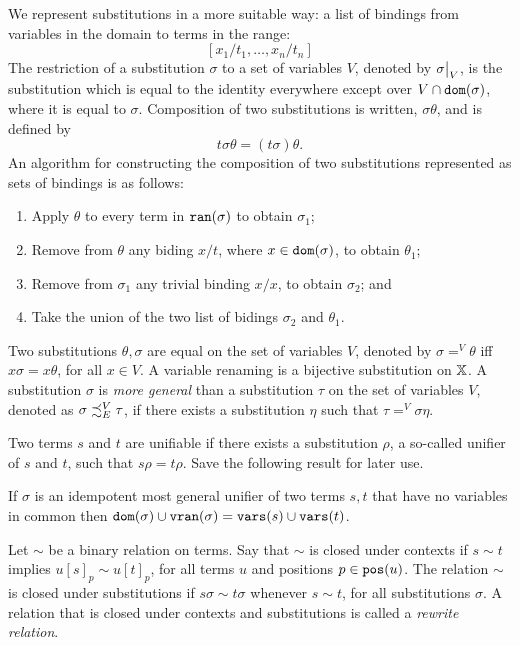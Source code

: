 We represent substitutions in a more suitable way: a list of bindings from variables in the domain to terms in the range:
$$[x_1 / t_1, \dots, x_n / t_n ]$$
The restriction of a substitution $\sigma$ to a set of variables $V$, denoted by $\restr{\sigma}{V}$, is the substitution which is equal to the identity everywhere except over $V \cap \mathtt{dom}(\sigma)$, where it is equal to $\sigma$. Composition of two substitutions is written, $\sigma \theta$, and is defined by
$$t\sigma \theta = (t\sigma)\theta.$$
An algorithm for constructing the composition of two substitutions represented as sets of bindings is as follows:
\begin{enumerate}
    \item Apply $\theta$ to every term in $\mathtt{ran}(\sigma)$ to obtain $\sigma_1$;
    \item Remove from $\theta$ any biding $x/t$, where $x \in \mathtt{dom}(\sigma)$, to obtain $\theta_1$;
    \item Remove from $\sigma_1$ any trivial binding $x/x$, to obtain $\sigma_2$; and
    \item Take the union of the two list of bidings $\sigma_2$ and $\theta_1$.
\end{enumerate}
Two substitutions $\theta, \sigma$ are equal on the set of variables $V$, denoted by $\sigma =^V \theta$ iff $x \sigma = x \theta$, for all $x \in V$. A variable renaming is a bijective substitution on $\mathbb{X}$. A substitution $\sigma$ is \textit{more general} than a substitution $\tau$ on the set of variables $V$, denoted as $\sigma \iqoless[E][V] \tau$, if there exists a substitution $\eta$ such that $ \tau =^V \sigma \eta$.


Two terms $s$ and $t$ are unifiable if there exists a substitution $\rho$, a so-called unifier of $s$ and $t$, such that $s \rho = t \rho$. Save the following result for later use.

\begin{lemma}\label{lemma:unifiers-preserve-variables}
    If $\sigma$ is an idempotent most general unifier of two terms $s, t$ that have no variables in common then $\mathtt{dom}(\sigma) \cup \mathtt{v}\mathtt{ran}(\sigma) = \mathtt{vars}(s) \cup \mathtt{vars}(t)$.
\end{lemma}

Let $\sim$ be a binary relation on terms. Say that $\sim$ is closed under contexts if $s \sim t$ implies $u[s]_p \sim u[t]_p$, for all terms $u$ and positions $p \in \mathtt{pos}(u)$. The relation $\sim$ is closed under substitutions if $s\sigma \sim t\sigma$ whenever $s \sim t$, for all substitutions $\sigma$. A relation that is closed under contexts and substitutions is called a \textit{rewrite relation}.

